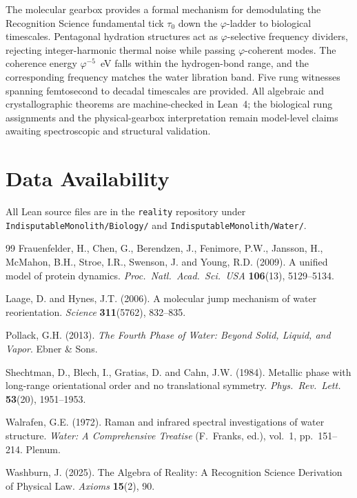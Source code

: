\documentclass[11pt,twocolumn]{article}
\begin{document}
The molecular gearbox provides a formal mechanism for demodulating the
Recognition Science fundamental tick $\tau_0$ down the $\varphi$-ladder to
biological timescales. Pentagonal hydration structures act as
$\varphi$-selective frequency dividers, rejecting integer-harmonic thermal
noise while passing $\varphi$-coherent modes. The coherence energy
$\varphi^{-5}$~eV falls within the hydrogen-bond range, and the
corresponding frequency matches the water libration band. Five rung
witnesses spanning femtosecond to decadal timescales are provided. All
algebraic and crystallographic theorems are machine-checked in Lean~4; the
biological rung assignments and the physical-gearbox interpretation remain
model-level claims awaiting spectroscopic and structural validation.

\section*{Data Availability}

All Lean source files are in the \texttt{reality} repository under
\texttt{IndisputableMonolith/Biology/} and
\texttt{IndisputableMonolith/Water/}.

\begin{thebibliography}{99}
Frauenfelder, H., Chen, G., Berendzen, J., Fenimore, P.W., Jansson, H.,
McMahon, B.H., Stroe, I.R., Swenson, J. and Young, R.D. (2009). A
unified model of protein dynamics.
\textit{Proc.~Natl.~Acad.~Sci.~USA} \textbf{106}(13), 5129--5134.

Laage, D. and Hynes, J.T. (2006). A molecular jump mechanism of water
reorientation. \textit{Science} \textbf{311}(5762), 832--835.

Pollack, G.H. (2013). \textit{The Fourth Phase of Water: Beyond Solid,
Liquid, and Vapor}. Ebner \& Sons.

Shechtman, D., Blech, I., Gratias, D. and Cahn, J.W. (1984). Metallic
phase with long-range orientational order and no translational symmetry.
\textit{Phys.~Rev.~Lett.} \textbf{53}(20), 1951--1953.

Walrafen, G.E. (1972). Raman and infrared spectral investigations of
water structure. \textit{Water: A Comprehensive Treatise} (F.~Franks,
ed.), vol.~1, pp.~151--214. Plenum.

Washburn, J. (2025). The Algebra of Reality: A Recognition Science
Derivation of Physical Law. \textit{Axioms} \textbf{15}(2), 90.
\end{thebibliography}
\end{document}
